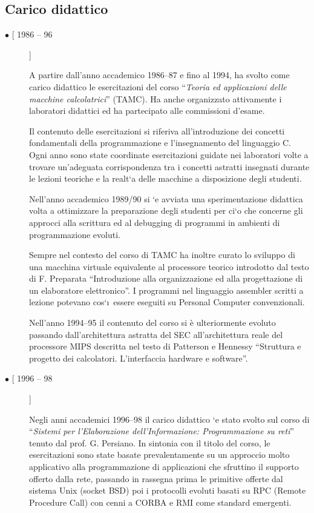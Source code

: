 \documentclass[11pt]{article}
\newlength{\boxsize}
\begin{document}
\subsection{Carico didattico}
\begin{description}
\item [$ \bullet $ [ 1986 -- 96]] \hfill 
\parbox[t]{\boxsize} { A partire dall'anno accademico 1986--87 e fino
al 1994, ha svolto come carico didattico le esercitazioni del corso
``{\sl Teoria ed applicazioni delle macchine calcolatrici}''
(TAMC). Ha anche organizzato attivamente i laboratori didattici ed ha
partecipato alle commissioni d'esame.

Il contenuto delle esercitazioni si riferiva all'introduzione dei
concetti fondamentali della programmazione e l'insegnamento del
linguaggio C.  Ogni anno sono state coordinate esercitazioni guidate
nei laboratori volte a trovare un'adeguata corrispondenza tra i
concetti astratti insegnati durante le lezioni teoriche e la realt\a`a
delle macchine a disposizione degli studenti.

Nell'anno accademico 1989/90 si \a`e avviata una sperimentazione
didattica volta a ottimizzare la preparazione degli studenti per
ci\a`o che concerne gli approcci alla scrittura ed al debugging di
programmi in ambienti di programmazione evoluti.

Sempre nel contesto del corso di TAMC ha inoltre curato lo sviluppo di
una macchina virtuale equivalente al processore teorico introdotto dal
testo di F. Preparata ``Introduzione alla organizzazione ed alla
progettazione di un elaboratore elettronico''. I programmi nel
linguaggio assembler scritti a lezione potevano cos\a`\i\  essere
eseguiti su  Personal Computer convenzionali.

Nell'anno 1994--95 il contenuto del corso si \`e ulteriormente
evoluto passando dall'architettura astratta del SEC all'architettura
reale del processore MIPS descritta nel testo di Patterson e Hennessy
``Struttura e progetto dei calcolatori. L'interfaccia hardware e
software''.}

\item [$ \bullet $ [ 1996 -- 98]] \hfill 
\parbox[t]{\boxsize} {
Negli anni accademici 1996--98 il carico didattico \a`e stato svolto sul
corso di ``{\sl Sistemi per l'Elaborazione dell'Informazione: Programmazione
su reti}'' tenuto dal prof. G. Persiano. 
In sintonia con il titolo del corso, le esercitazioni sono state
basate prevalentamente su un approccio molto applicativo alla
programmazione di applicazioni che sfruttino il supporto offerto dalla rete,
passando in rassegna prima le primitive offerte dal sistema Unix (socket BSD) poi
i protocolli evoluti basati su RPC (Remote Procedure Call) con cenni a
CORBA e RMI come standard emergenti.}


\end{description}
\end{document}
